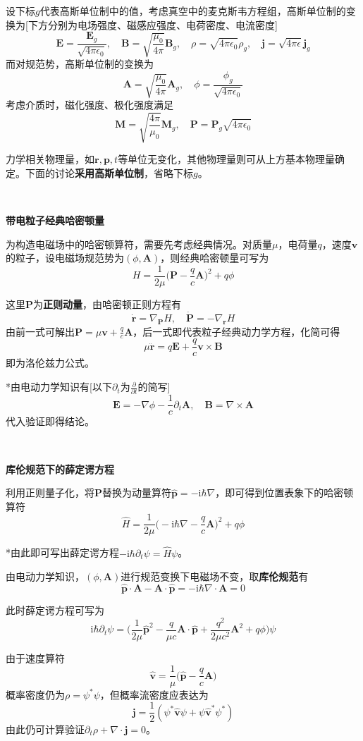 \documentclass[a4paper,UTF8,fontset=windows]{ctexart}
\newcommand*{\ir}{\mathrm{i}}
\newcommand*{\br}{\mathbf{r}}
\newcommand*{\bp}{\mathbf{p}}
\newcommand*{\ba}{\mathbf{A}}
\begin{document}
设下标$g$代表高斯单位制中的值，考虑真空中的麦克斯韦方程组，高斯单位制的变换为[下方分别为电场强度、磁感应强度、电荷密度、电流密度]
$$\mathbf{E}=\frac{\mathbf{E}_g}{\sqrt{4\pi\epsilon_0}},\quad\mathbf{B}=\sqrt{\frac{\mu_0}{4\pi}}\mathbf{B}_g,\quad\rho=\sqrt{4\pi\epsilon_0}\rho_g,\quad\mathbf{j}=\sqrt{4\pi\epsilon}\mathbf{j}_g$$
而对规范势，高斯单位制的变换为
$$\ba=\sqrt{\frac{\mu_0}{4\pi}}\ba_g,\quad\phi=\frac{\phi_g}{\sqrt{4\pi\epsilon_0}}$$
考虑介质时，磁化强度、极化强度满足
$$\mathbf{M}=\sqrt{\frac{4\pi}{\mu_0}}\mathbf{M}_g,\quad\mathbf{P}=\mathbf{P}_g\sqrt{4\pi\epsilon_0}$$

力学相关物理量，如$\br,\bp,t$等单位无变化，其他物理量则可从上方基本物理量确定。下面的讨论\textbf{采用高斯单位制}，省略下标$g$。

\

\textbf{带电粒子经典哈密顿量}

为构造电磁场中的哈密顿算符，需要先考虑经典情况。对质量$\mu$，电荷量$q$，速度$\mathbf{v}$的粒子，设电磁场规范势为$(\phi,\ba)$，则经典哈密顿量可写为
$$H=\frac{1}{2\mu}\bigg(\mathbf{P}-\frac{q}{c}\ba\bigg)^2+q\phi$$

这里$\mathbf{P}$为\textbf{正则动量}，由哈密顿正则方程有
$$\dot{\br}=\nabla_{\mathbf{P}}H,\quad\dot{\mathbf{P}}=-\nabla_{\br}H$$
由前一式可解出$\mathbf{P}=\mu\mathbf{v}+\frac{q}{c}\ba$，后一式即代表粒子经典动力学方程，化简可得
$$\mu\ddot{\br}=q\mathbf{E}+\frac{q}{c}\mathbf{v}\times\mathbf{B}$$
即为洛伦兹力公式。

*由电动力学知识有[以下$\partial_t$为$\frac{\partial}{\partial t}$的简写]
$$\mathbf{E}=-\nabla\phi-\frac{1}{c}\partial_t\ba,\quad\mathbf{B}=\nabla\times\ba$$
代入验证即得结论。

\

\textbf{库伦规范下的薛定谔方程}

利用正则量子化，将$\mathbf{P}$替换为动量算符$\hat{\bp}=-\ir\hbar\nabla$，即可得到位置表象下的哈密顿算符
$$\hat{H}=\frac{1}{2\mu}\bigg(-\ir\hbar\nabla-\frac{q}{c}\ba\bigg)^2+q\phi$$

*由此即可写出薛定谔方程$-\ir\hbar\partial_t\psi=\hat{H}\psi$。

由电动力学知识，$(\phi,\ba)$进行规范变换下电磁场不变，取\textbf{库伦规范}有
$$\hat{\bp}\cdot\ba-\ba\cdot\hat{\bp}=-\ir\hbar\nabla\cdot\ba=0$$

此时薛定谔方程可写为
$$\ir\hbar\partial_t\psi=\bigg(\frac{1}{2\mu}\hat{\bp}^2-\frac{q}{\mu c}\ba\cdot\hat{\bp}+\frac{q^2}{2\mu c^2}\ba^2+q\phi\bigg)\psi$$

由于速度算符
$$\hat{\mathbf{v}}=\frac{1}{\mu}\bigg(\hat{\bp}-\frac{q}{c}\ba\bigg)$$
概率密度仍为$\rho=\psi^*\psi$，但概率流密度应表达为
$$\mathbf{j}=\frac{1}{2}(\psi^*\hat{\mathbf{v}}\psi+\psi\hat{\mathbf{v}}^*\psi^*)$$
由此仍可计算验证$\partial_t\rho+\nabla\cdot\mathbf{j}=0$。
\end{document}
